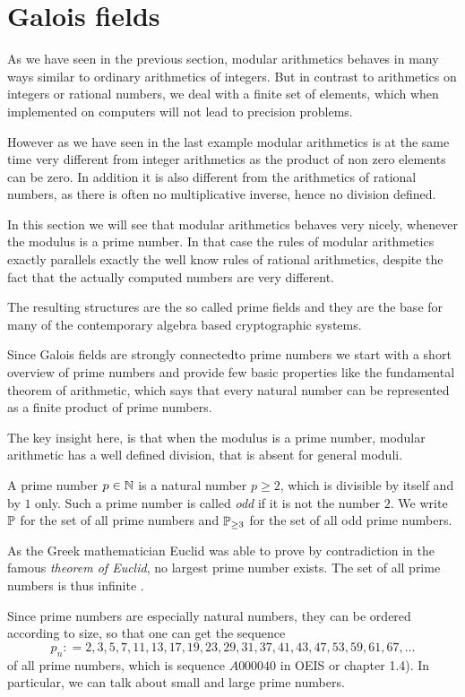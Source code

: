 \section{Galois fields}
As we have seen in the previous section, modular arithmetics behaves in many ways similar to ordinary arithmetics of integers. But in contrast to arithmetics on integers or rational numbers, we deal with a finite set of elements, which when implemented on computers will not lead to precision problems.

However as we have seen in the last example modular arithmetics is at the same time very different from integer arithmetics as the product of non zero elements can be zero. In addition it is also different from the arithmetics of rational numbers, as there is often no multiplicative inverse, hence no division defined. 

In this section we will see that modular arithmetics behaves very nicely, whenever the modulus is a prime number. In that case the rules of modular arithmetics exactly parallels exactly the well know rules of rational arithmetics, despite the fact that the actually computed numbers are very different.

The resulting structures are the so called prime fields and they are the base for many of the contemporary algebra based cryptographic systems.

Since Galois fields are strongly connectedto prime numbers we start with
a short overview of prime numbers and provide few basic properties like the fundamental theorem of arithmetic, which says that every natural number can be represented as a finite product of prime numbers.

The key insight here, is that when the modulus is a prime number, modular arithmetic has a well defined division, that is absent for general moduli.

A prime number $ p \in \mathbb{N} $ is a natural number $ p \geq 2 $, which is divisible by itself and by $ 1 $ only. Such a prime number is called \textit{odd} if it is not the number $ 2 $. We write $ \mathbb{P} $ for the set of all prime numbers and $ \mathbb{P} _{\geq 3} $ for the set of all odd prime numbers.

As the Greek mathematician Euclid was able to prove by contradiction in the famous \textit{theorem of Euclid}, no largest prime number exists. The set of all prime numbers is thus infinite \cite{AL}.

Since prime numbers are especially natural numbers, they can be ordered according to size, so that one can get the sequence
\begin{equation}
\label{eq: primenumber_sequence}
p_n: = 2, 3, 5, 7, 11, 13, 17, 19, 23, 29, 31, 37, 41, 43, 47, 53, 59, 61, 67, \ldots
\end{equation}
of all prime numbers, which is sequence $ A000040 $ in OEIS or \cite{HW} chapter 1.4). In particular, we can talk about small and large prime numbers.

